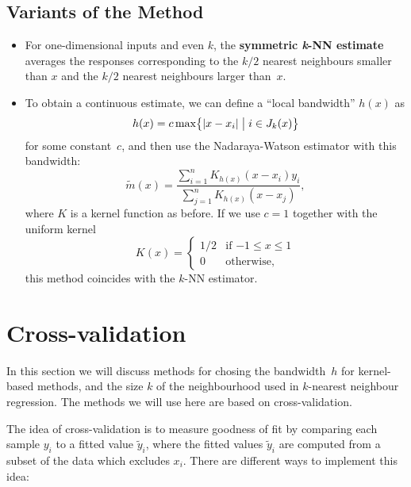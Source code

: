 \documentclass[
  a4paper,
]{article}
\theoremstyle{definition}
\theoremstyle{definition}
\theoremstyle{definition}
\theoremstyle{definition}
\theoremstyle{remark}
\begin{document}
\hypertarget{variants-of-the-method}{%
\subsection{Variants of the Method}\label{variants-of-the-method}}

\begin{itemize}
\item
  For one-dimensional inputs and even \(k\), the \textbf{symmetric \emph{k}-NN
  estimate} averages the responses corresponding to the \(k/2\) nearest
  neighbours smaller than \(x\) and the \(k/2\) nearest neighbours larger
  than~\(x\).
\item
  To obtain a continuous estimate, we can define a ``local bandwidth''
  \(h(x)\) as \begin{equation*}
    h(x) = c \max\bigl\{ |x - x_i| \bigm| i \in J_k(x) \bigr\}
  \end{equation*} for some constant~\(c\), and then use the
  Nadaraya-Watson estimator with this bandwidth: \begin{equation*}
    \tilde m(x)
    = \frac{\sum_{i=1}^n K_{h(x)}(x - x_i) y_i}{\sum_{j=1}^n K_{h(x)}(x - x_j)},
  \end{equation*} where \(K\) is a kernel function as before. If we use
  \(c = 1\) together with the uniform kernel \begin{equation*}
    K(x)
    = \begin{cases}
        1/2 & \mbox{if $-1 \leq x \leq 1$} \\
        0 & \mbox{otherwise,}
      \end{cases}
  \end{equation*} this method coincides with the \(k\)-NN estimator.
\end{itemize}

\clearpage

\hypertarget{X08-xval}{%
\section{Cross-validation}\label{X08-xval}}

In this section we will discuss methods for chosing the bandwidth~\(h\)
for kernel-based methods, and the size \(k\) of the neighbourhood used
in \(k\)-nearest neighbour regression. The methods we will use here
are based on cross-validation.

The idea of cross-validation is to measure goodness of fit by comparing each
sample \(y_i\) to a fitted value \(\tilde y_i\), where the fitted values \(\tilde y_i\) are computed from a subset of the data which excludes \(x_i\). There are
different ways to implement this idea:
\end{document}
